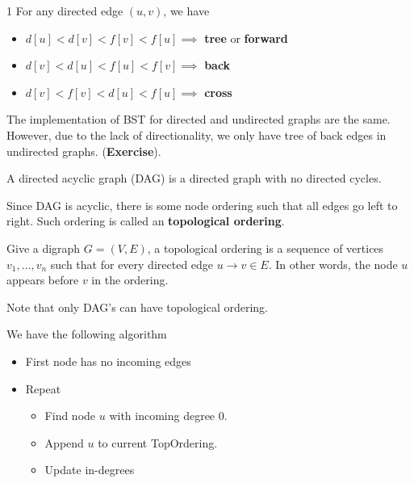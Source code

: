 \begin{multicols}{1}
For any directed edge $(u,v)$, we have 
\begin{itemize}
    \item $d[u] < d[v] < f[v] < f[u] \implies$ \textbf{tree} or \textbf{forward}
    \item $d[v] < d[u] < f[u] < f[v] \implies$ \textbf{back}
    \item $d[v] < f[v] < d[u] < f[u] \implies $ \textbf{cross}
\end{itemize}
The implementation of BST for directed and undirected graphs are the same. However, due to the lack of directionality, we only have tree of back edges in undirected graphs. (\textbf{Exercise}). 
\begin{definition}
    A directed acyclic graph (DAG) is a directed graph with no directed cycles. 
\end{definition}
Since DAG is acyclic, there is some node ordering such that all edges go left to right. Such ordering is called an \textbf{topological ordering}. 
\begin{definition}
    Give a digraph $G = (V, E)$, a topological ordering is a sequence of vertices $v_1, \ldots, v_n$ such that for every directed edge $u \to v \in E$. 
    In other words, the node $u$ appears before $v$ in the ordering. 
\end{definition}

Note that only DAG's can have topological ordering. 

We have the following algorithm
\begin{itemize}
    \item First node has no incoming edges
    \item Repeat
    \begin{itemize}
        \item Find node $u$ with incoming degree $0$.
        \item Append $u$ to current TopOrdering.
        \item Update in-degrees
    \end{itemize}
\end{itemize}
\end{multicols}

